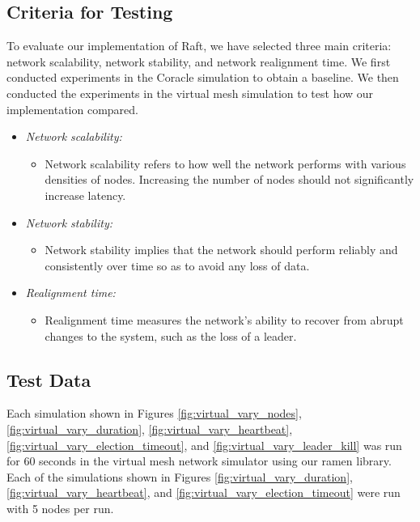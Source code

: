 \subsection{Criteria for Testing}

To evaluate our implementation of Raft, we have selected three main criteria: network scalability, network stability, and network realignment time. We first conducted experiments in the Coracle simulation to obtain a baseline. We then conducted the experiments in the virtual mesh simulation to test how our implementation compared.

\begin{itemize}
    \item \textit{Network scalability:}
    \begin{itemize}
        \item Network scalability refers to how well the network performs with various densities of nodes. Increasing the number of nodes should not significantly increase latency.
    \end{itemize}

    \item \textit{Network stability:}
    \begin{itemize}
        \item Network stability implies that the network should perform reliably and consistently over time so as to avoid any loss of data. 
    \end{itemize}
    
    \item \textit{Realignment time:}
    \begin{itemize}
        \item Realignment time measures the network's ability to recover from abrupt changes to the system, such as the loss of a leader.
    \end{itemize}
\end{itemize}



\subsection{Test Data}

Each simulation shown in Figures \ref{fig:virtual_vary_nodes}, \ref{fig:virtual_vary_duration}, \ref{fig:virtual_vary_heartbeat}, \ref{fig:virtual_vary_election_timeout}, and \ref{fig:virtual_vary_leader_kill} was run for 60 seconds in the virtual mesh network simulator using our ramen library. Each of the simulations shown in Figures \ref{fig:virtual_vary_duration}, \ref{fig:virtual_vary_heartbeat}, and \ref{fig:virtual_vary_election_timeout} were run with 5 nodes per run.

